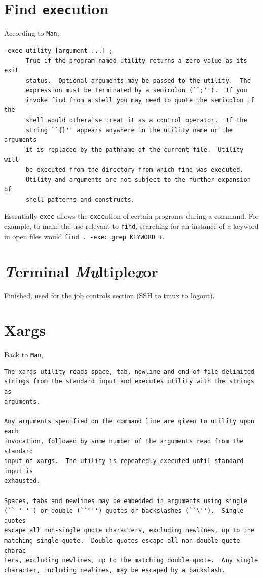 \documentclass{article}
\newcommand{\shellcmd}[1]{\texttt{\colorbox{gray!30}{#1}}}
\begin{document}
\section{Find \shellcmd{exec}ution}
According to \shellcmd{Man},

\begin{verbatim}
-exec utility [argument ...] ;
      True if the program named utility returns a zero value as its exit
      status.  Optional arguments may be passed to the utility.  The
      expression must be terminated by a semicolon (``;'').  If you
      invoke find from a shell you may need to quote the semicolon if the
      shell would otherwise treat it as a control operator.  If the
      string ``{}'' appears anywhere in the utility name or the arguments
      it is replaced by the pathname of the current file.  Utility will
      be executed from the directory from which find was executed.
      Utility and arguments are not subject to the further expansion of
      shell patterns and constructs.
\end{verbatim}

Essentially \shellcmd{exec} allows the \shellcmd{exec}ution of certain programs during a command. For example, to make the use relevant to \shellcmd{find}, searching for an instance of a keyword in open files would \shellcmd{find . -exec grep KEYWORD {} +}.


\section{\textit{T}erminal \textit{Mu}ltiple\textit{x}or}
Finished, used for the job controls section (SSH to tmux to logout).

\section{Xargs}
Back to \shellcmd{Man},

\begin{verbatim}
The xargs utility reads space, tab, newline and end-of-file delimited
strings from the standard input and executes utility with the strings as
arguments.

Any arguments specified on the command line are given to utility upon each
invocation, followed by some number of the arguments read from the standard
input of xargs.  The utility is repeatedly executed until standard input is
exhausted.

Spaces, tabs and newlines may be embedded in arguments using single
(`` ' '') or double (``"'') quotes or backslashes (``\'').  Single quotes
escape all non-single quote characters, excluding newlines, up to the
matching single quote.  Double quotes escape all non-double quote charac-
ters, excluding newlines, up to the matching double quote.  Any single
character, including newlines, may be escaped by a backslash.
\end{verbatim}
\end{document}
